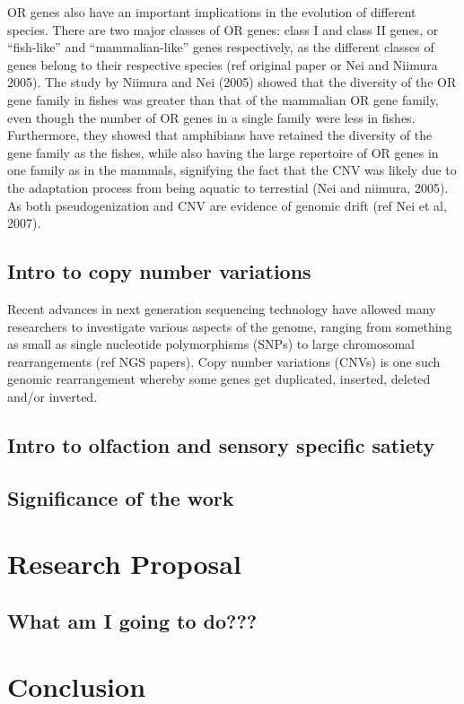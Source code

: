 \documentclass[a4paper, 12pt]{article}
\begin{document}
OR genes also have an important implications in the evolution of different species.
There are two major classes of OR genes: class I and class II genes, or ``fish-like'' and ``mammalian-like'' genes respectively, as the different classes of genes belong to their respective species (ref original paper or Nei and Niimura 2005).
The study by Niimura and Nei (2005) showed that the diversity of the OR gene family in fishes was greater than that of the mammalian OR gene family, even though the number of OR genes in a single family were less in fishes.
Furthermore, they showed that amphibians have retained the diversity of the gene family as the fishes, while also having the large repertoire of OR genes in one family as in the mammals, signifying the fact that the CNV was likely due to the adaptation process from being aquatic to terrestial (Nei and niimura, 2005).
As both pseudogenization and CNV are evidence of genomic drift (ref Nei et al, 2007).



\subsection*{Intro to copy number variations}

Recent advances in next generation sequencing technology have allowed many researchers to investigate various aspects of the genome, ranging from something as small as single nucleotide polymorphisms (SNPs) to large chromosomal rearrangements (ref NGS papers).
Copy number variations (CNVs) is one such genomic rearrangement whereby some genes get duplicated, inserted, deleted and/or inverted.

\subsection*{Intro to olfaction and sensory specific satiety}



\subsection*{Significance of the work}

\section*{Research Proposal}

\subsection*{What am I going to do???}

\section*{Conclusion}
\end{document}

